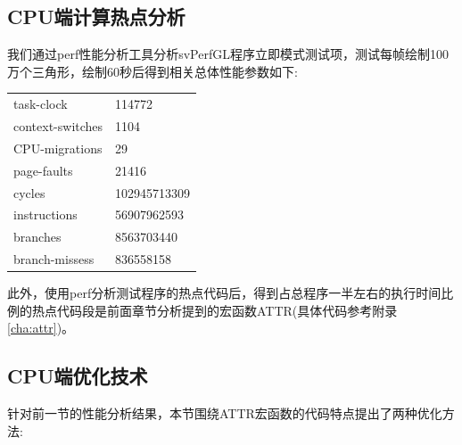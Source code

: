 \subsection{CPU端计算热点分析}

我们通过perf性能分析工具分析svPerfGL程序立即模式测试项，测试每帧绘制100万个三角形，绘制60秒后得到相关总体性能参数如下:

\begin{center}  
\tablelasttail{\bottomrule}

\begin{supertabular}{p{6.cm}p{6.cm}}
	task-clock& 114772\\
	context-switches& 1104\\
	CPU-migrations& 29\\
	page-faults& 21416\\
	cycles & 102945713309\\
	instructions& 56907962593\\
	branches& 8563703440\\
	branch-missess& 836558158\\
\end{supertabular}
\end{center}

此外，使用perf分析测试程序的热点代码后，得到占总程序一半左右的执行时间比例的热点代码段是前面章节分析提到的宏函数ATTR(具体代码参考附录\ref{cha:attr})。




\subsection{CPU端优化技术}

针对前一节的性能分析结果，本节围绕ATTR宏函数的代码特点提出了两种优化方法:

